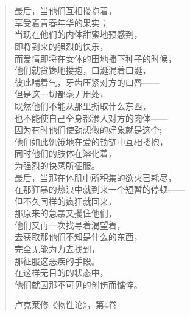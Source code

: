 \chapter*{}

\thispagestyle{empty}
\null\vfill
\begin{quote}
    
最后，当他们互相搂抱着，\\
享受着青春年华的果实；\\
当现在他们的内体甜蜜地预感到，\\
即将到来的强烈的快乐，\\
而爱情即将在女体的田地播下种子的时候，\\
他们就贪馋地搂抱，口涎混着口涎，\\
彼此喘着气，牙齿压紧对方的口唇——\\
但是这一切都毫无用处，\\
既然他们不能从那里撕取什么东西，\\
也不能使自己全身都渗入对方的肉体——\\
因为有时他们使劲想做的好象就是这个; \\
他们如此饥饿地在爱的锁链中互相搂抱，\\
同时他们的肢体在溶化着，\\
为强烈的快感所征服。\\
最后，当那在体肌中所积集的欲火已耗尽，\\
在那狂暴的热浪中就到来一个短暂的停顿——\\
但不久同样的疯狂就回来，\\
那原来的急暴又攫住他们，\\
他们又再一次找寻着渴望着，\\
去获取那他们不知是什么的东西，\\
完全无能为力去找到，\\
那征服这恶疾的手段。 \\
在这样无目的的状态中，\\
他们就因那不可见的创伤而憔悴。

\hfill 卢克莱修《物性论》，第4卷\vfill

\end{quote}